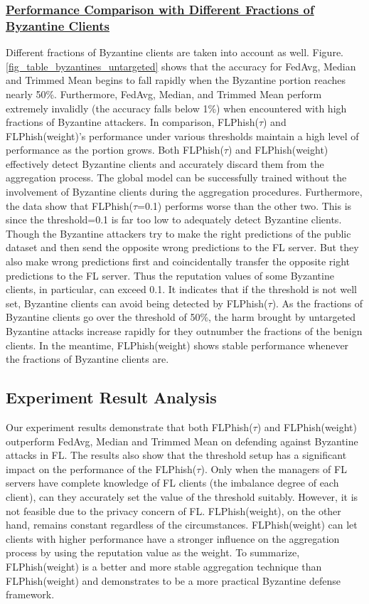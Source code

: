\documentclass[journal]{IEEEtran}
\begin{document}
    \subsubsection{\ul{Performance Comparison with Different Fractions of Byzantine Clients}} Different fractions of Byzantine clients are taken into account as well. Figure. \ref{fig_table_byzantines_untargeted} shows that the accuracy for FedAvg, Median and Trimmed Mean begins to fall rapidly when the Byzantine portion reaches nearly 50\%. Furthermore, FedAvg, Median, and Trimmed Mean perform extremely invalidly (the accuracy falls below 1\%) when encountered with high fractions of Byzantine attackers. In comparison, FLPhish($\tau$) and FLPhish(weight)'s performance under various thresholds maintain a high level of performance as the portion grows. Both FLPhish($\tau$) and FLPhish(weight) effectively detect Byzantine clients and accurately discard them from the aggregation process. The global model can be successfully trained without the involvement of Byzantine clients during the aggregation procedures. Furthermore, the data show that FLPhish($\tau$=0.1) performs worse than the other two. This is since the threshold=0.1 is far too low to adequately detect Byzantine clients. Though the Byzantine attackers try to make the right predictions of the public dataset and then send the opposite wrong predictions to the FL server. But they also make wrong predictions first and coincidentally transfer the opposite right predictions to the FL server. Thus the reputation values of some Byzantine clients, in particular, can exceed 0.1. It indicates that if the threshold is not well set, Byzantine clients can avoid being detected by FLPhish($\tau$). As the fractions of Byzantine clients go over the threshold of 50\%, the harm brought by untargeted Byzantine attacks increase rapidly for they outnumber the fractions of the benign clients. In the meantime, FLPhish(weight) shows stable performance whenever the fractions of Byzantine clients are.

    \subsection{{Experiment Result Analysis}} Our experiment results demonstrate that both FLPhish($\tau$) and FLPhish(weight) outperform FedAvg, Median \cite{ref_13_defense} and Trimmed Mean \cite{ref_13_defense} on defending against Byzantine attacks in FL. The results also show that the threshold setup has a significant impact on the performance of the FLPhish($\tau$). Only when the managers of FL servers have complete knowledge of FL clients (the imbalance degree of each client), can they accurately set the value of the threshold suitably. However, it is not feasible due to the privacy concern of FL. FLPhish(weight), on the other hand, remains constant regardless of the circumstances. FLPhish(weight) can let clients with higher performance have a stronger influence on the aggregation process by using the reputation value as the weight. To summarize, FLPhish(weight) is a better and more stable aggregation technique than FLPhish(weight) and demonstrates to be a more practical Byzantine defense framework.
\end{document}
